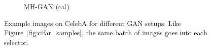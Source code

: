\begin{figure}[htbp]
\begin{subfigure}[b]{0.49\textwidth}
       \caption{MH-GAN (cal)}
    \end{subfigure}
    \caption{{\small
    Example images on CelebA for different GAN setups.
    Like Figure~\ref{fig:cifar_samples}, the same batch of images goes into each selector.
    }}
    \label{fig:celeba_samples}
\end{figure}


